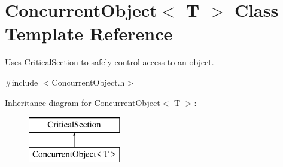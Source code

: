 \hypertarget{class_concurrent_object}{
\section{ConcurrentObject$<$ T $>$ Class Template Reference}
\label{class_concurrent_object}
}


Uses \hyperlink{class_critical_section}{CriticalSection} to safely control access to an object.  




{\ttfamily \#include $<$ConcurrentObject.h$>$}

Inheritance diagram for ConcurrentObject$<$ T $>$:\begin{figure}[H]
\begin{center}
\leavevmode
\includegraphics[height=2.000000cm]{class_concurrent_object}
\end{center}
\end{figure}
